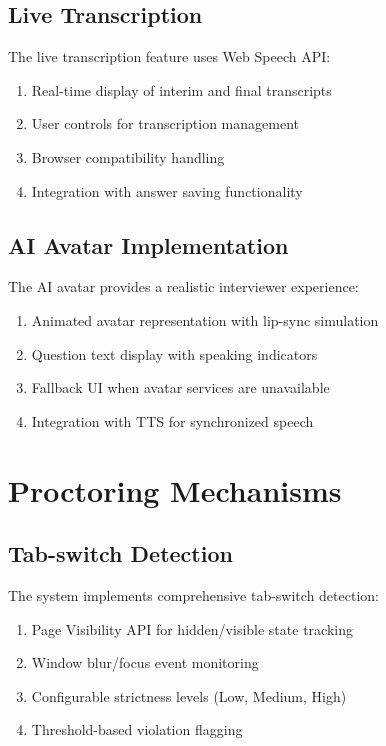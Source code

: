 \documentclass[12pt, conference]{IEEEtran}
\begin{document}
\subsection{Live Transcription}

The live transcription feature uses Web Speech API:
\begin{enumerate}
    \item Real-time display of interim and final transcripts
    \item User controls for transcription management
    \item Browser compatibility handling
    \item Integration with answer saving functionality
\end{enumerate}

\subsection{AI Avatar Implementation}

The AI avatar provides a realistic interviewer experience:
\begin{enumerate}
    \item Animated avatar representation with lip-sync simulation
    \item Question text display with speaking indicators
    \item Fallback UI when avatar services are unavailable
    \item Integration with TTS for synchronized speech
\end{enumerate}

\section{Proctoring Mechanisms}

\subsection{Tab-switch Detection}

The system implements comprehensive tab-switch detection:
\begin{enumerate}
    \item Page Visibility API for hidden/visible state tracking
    \item Window blur/focus event monitoring
    \item Configurable strictness levels (Low, Medium, High)
    \item Threshold-based violation flagging
\end{enumerate}
\end{document}
